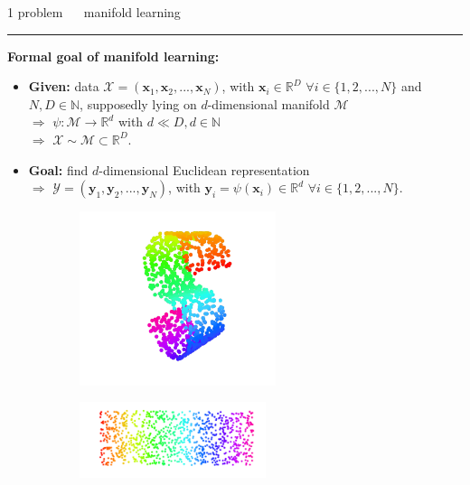 \documentclass[11pt, compress, t, notes = noshow, xcolor = table, 
aspectratio = 1610]{beamer}
\newcommand{\highlight}[1]{\textcolor{highlightcol}{\textbf{#1}}}
\newcommand{\arritem}{\item[\highlight{$\rightarrow$}]}
\newcommand{\mani}{\mathcal{M}}
\newcommand{\N}{\mathbb{N}}
\newcommand{\R}{\mathbb{R}}
\newcommand{\RD}{\mathbb{R}^D}
\newcommand{\Rd}{\mathbb{R}^d}
\newcommand{\setN}{\{1, 2, ..., N\}}
\newcommand{\X}{\mathcal{X}}
\newcommand{\x}{\bm{x}}
\newcommand{\Y}{\mathcal{Y}}
\newcommand{\y}{\bm{y}}
\begin{document}
\LARGE
\begin{frame}{\textcolor{gray!90}{1 problem} ~~ manifold learning}
\normalsize
\vspace{-0.5cm}
\noindent \textcolor{gray!90}{\rule{\textwidth}{1pt}}
\smallskip

\textbf{Formal goal of manifold learning:}
\medskip
\begin{itemize}
  \arritem \textbf{Given:} data $\X = (\x_1, \x_2, ..., \x_N)$, with $\x_i \in 
  \RD$ $\forall i \in \setN$ and $N, D \in \N$, supposedly lying on 
  $d$-dimensional manifold $\mani$ \\
  $\Rightarrow$ $\psi: \mani \rightarrow \Rd$ with $d \ll D, d \in \N$ \\
  $\Rightarrow$ $\X \sim \mani \subset \RD.$ 
  \medskip
  \arritem \textbf{Goal:} find $d$-dimensional Euclidean representation \\
  $\Rightarrow$ $\Y = (\y_1, \y_2, ..., \y_N)$, with 
  $\y_i = \psi(\x_i) \in \R^d$ $\forall i \in \setN$.
\end{itemize}

\vfill

\begin{figure}[H]
 \begin{subfigure}[c]{0.2\textwidth}
  \centering
   \includegraphics[trim = 70 30 70 30, clip, %
      width = 0.63\textwidth]{figures/s_curve}
 \end{subfigure}
 \hfill
 \begin{subfigure}[c]{0.7\textwidth}
   \includegraphics[trim = 80 20 0 0, clip, %
      width = 0.6\textwidth]{figures/s_curve_undone}
 \end{subfigure}
\end{figure}

\end{frame}
\end{document}
